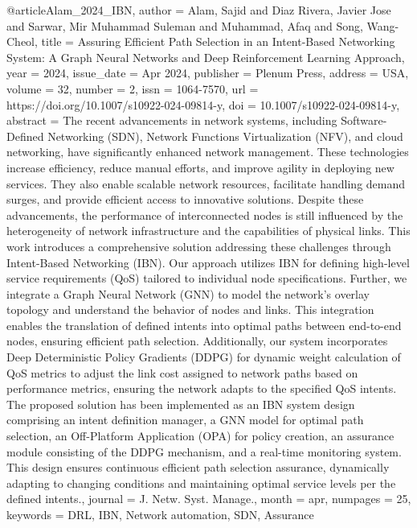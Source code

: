 {{%
@article{Alam_2024_IBN,
author = {Alam, Sajid and Diaz Rivera, Javier Jose and Sarwar, Mir Muhammad Suleman and Muhammad, Afaq and Song, Wang-Cheol},
title = {{Assuring Efficient Path Selection in an Intent-Based Networking System: A Graph Neural Networks and Deep Reinforcement Learning Approach}},
year = {2024},
issue_date = {Apr 2024},
publisher = {Plenum Press},
address = {USA},
volume = {32},
number = {2},
issn = {1064-7570},
url = {https://doi.org/10.1007/s10922-024-09814-y},
doi = {10.1007/s10922-024-09814-y},
abstract = {The recent advancements in network systems, including Software-Defined Networking (SDN), Network Functions Virtualization (NFV), and cloud networking, have significantly enhanced network management. These technologies increase efficiency, reduce manual efforts, and improve agility in deploying new services. They also enable scalable network resources, facilitate handling demand surges, and provide efficient access to innovative solutions. Despite these advancements, the performance of interconnected nodes is still influenced by the heterogeneity of network infrastructure and the capabilities of physical links. This work introduces a comprehensive solution addressing these challenges through Intent-Based Networking (IBN). Our approach utilizes IBN for defining high-level service requirements (QoS) tailored to individual node specifications. Further, we integrate a Graph Neural Network (GNN) to model the network’s overlay topology and understand the behavior of nodes and links. This integration enables the translation of defined intents into optimal paths between end-to-end nodes, ensuring efficient path selection. Additionally, our system incorporates Deep Deterministic Policy Gradients (DDPG) for dynamic weight calculation of QoS metrics to adjust the link cost assigned to network paths based on performance metrics, ensuring the network adapts to the specified QoS intents. The proposed solution has been implemented as an IBN system design comprising an intent definition manager, a GNN model for optimal path selection, an Off-Platform Application (OPA) for policy creation, an assurance module consisting of the DDPG mechanism, and a real-time monitoring system. This design ensures continuous efficient path selection assurance, dynamically adapting to changing conditions and maintaining optimal service levels per the defined intents.},
journal = {J. Netw. Syst. Manage.},
month = apr,
numpages = {25},
keywords = {DRL, IBN, Network automation, SDN, Assurance}
}

}}
